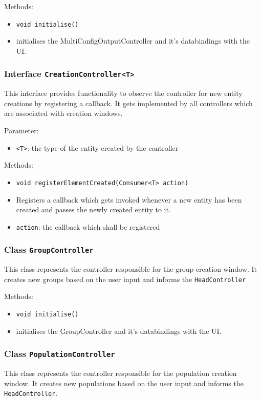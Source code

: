 \documentclass[parskip=full,11pt]{scrartcl}
\begin{document}
Methods:
\begin{itemize}\itemsep -10pt
\item \texttt{void initialise()}
\item[] initialises the MultiConfigOutputController and it's databindings with the UI.
\end{itemize}

\subsubsection{Interface \texttt{CreationController<T>}}

This interface provides functionality to observe the controller for new entity creations by registering a callback. It gets implemented by all controllers which are associated with creation windows.

Parameter:
\begin{itemize} \itemsep -10pt
	\item \texttt{<T>}: the type of the entity created by the controller
\end{itemize}

Methods:
\begin{itemize}\itemsep -10pt
\item \texttt{void registerElementCreated(Consumer<T> action)}
\item[] Registers a callback which gets invoked whenever a new entity has been created and passes the newly created entity to it.
\item[] \texttt{action}: the callback which shall be registered
\end{itemize}

\subsubsection{Class \texttt{GroupController}}
This class represents the controller responsible for the group creation window. It creates new groups based on the user input and informs the \texttt{HeadController}

Methods:
\begin{itemize}\itemsep -10pt
\item \texttt{void initialise()}
\item[] initialises the GroupController and it's databindings with the UI.
\end{itemize}

\subsubsection{Class \texttt{PopulationController}}
This class represents the controller responsible for the population creation window. It creates new populations based on the user input and informs the \texttt{HeadController}.
\end{document}
